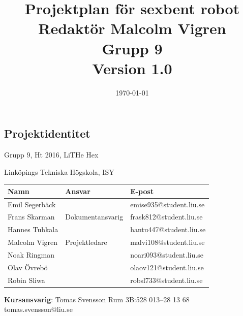 \documentclass[a4paper,titlepage,12pt]{article}
\begin{document}
	\title{\LARGE
		\textbf{Projektplan för sexbent robot} \\
		\vspace*{0.5\baselineskip}
		\large
		Redaktör Malcolm Vigren \\
		Grupp 9 \\
		\small
		\vspace*{0.5\baselineskip}
		Version 1.0}

	\date{\today}

		\maketitle
	
	\newpage
	
	\begin{center}


		\section*{Projektidentitet}
		Grupp 9, Ht 2016, LiTHe Hex

		Linköpings Tekniska Högskola, ISY

		\renewcommand*{\arraystretch}{1.4}
		\begin{longtable}[c]{ l l l }
			\textbf{Namn} & \textbf{Ansvar} & \textbf{E-post} \\ \midrule
			Emil Segerbäck & & emise935@student.liu.se \\ \midrule
			Frans Skarman & Dokumentansvarig & frask812@student.liu.se \\ \midrule
			Hannes Tuhkala & & hantu447@student.liu.se \\ \midrule
			Malcolm Vigren & Projektledare & malvi108@student.liu.se \\ \midrule
			Noak Ringman &  & noari093@student.liu.se \\ \midrule
			Olav Övrebö &  & olaov121@student.liu.se \\ \midrule
			Robin Sliwa & & robsl733@student.liu.se \\
		\end{longtable}

		\centering
		\textbf{Kursansvarig}: Tomas Svensson Rum 3B:528 013--28 13 68 tomas.svensson@liu.se

		\newpage
		\tableofcontents
		\newpage



\end{center}
\end{document}
